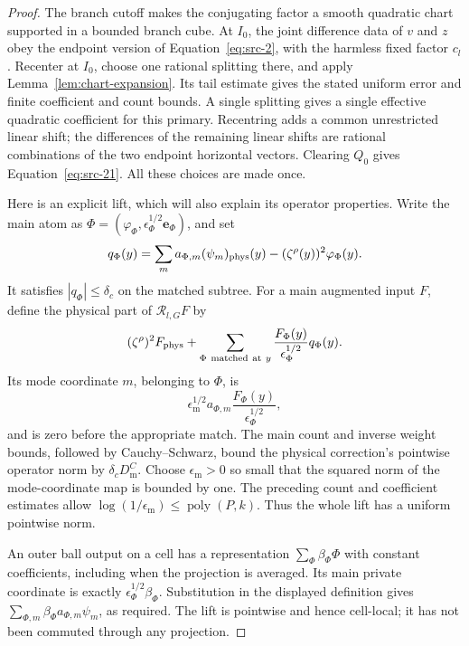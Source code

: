 \begin{proof}
The branch cutoff makes the conjugating factor a smooth quadratic
chart supported in a bounded branch cube.  At \(I_0\), the joint
difference data of \(v\) and \(z\) obey the endpoint version of
Equation~\eqref{eq:src-2}, with the harmless fixed factor \(c_l\).
Recenter at \(I_0\), choose one rational splitting there, and apply
Lemma~\ref{lem:chart-expansion}.  Its tail estimate gives the stated
uniform error and finite coefficient and count bounds.  A single
splitting gives a single effective quadratic coefficient for this
primary.  Recentring adds a common unrestricted linear shift; the
differences of the remaining linear shifts are rational combinations
of the two endpoint horizontal vectors.  Clearing \(Q_0\) gives
Equation~\eqref{eq:src-21}.  All these choices are made once.

Here is an explicit lift, which will also explain its operator
properties.  Write the main atom as
\(\Phi=(\varphi_\Phi,\epsilon_\Phi^{1/2}\mathbf e_\Phi)\), and set
\[
 q_\Phi(y)=
 \sum_m a_{\Phi,m}(\psi_m)_{\mathrm{phys}}(y)
       -(\zeta^\rho(y))^2\varphi_\Phi(y).
\]
It satisfies \(|q_\Phi|\le\delta_c\) on the matched subtree.
For a main augmented input \(F\), define the physical part of
\(\mathscr R_{l,G}F\) by
\[
 (\zeta^\rho)^2 F_{\mathrm{phys}}
 +\sum_{\Phi\ {\rm matched\ at}\ y}
       \frac{F_\Phi(y)}{\epsilon_\Phi^{1/2}}q_\Phi(y).
\]
Its mode coordinate \(m\), belonging to \(\Phi\), is
\[
 \epsilon_{\mathrm m}^{1/2}a_{\Phi,m}
       \frac{F_\Phi(y)}{\epsilon_\Phi^{1/2}},
\]
and is zero before the appropriate match.  The main count and inverse
weight bounds, followed by Cauchy--Schwarz, bound the physical
correction's pointwise operator norm by
\(\delta_c D_{\mathrm m}^{C}\).  Choose
\(\epsilon_{\mathrm m}>0\) so small that the squared norm of the
mode-coordinate map is bounded by one.  The preceding count and
coefficient estimates allow
\(\log(1/\epsilon_{\mathrm m})\le\operatorname{poly}(P,k)\).
Thus the whole lift has a uniform pointwise norm.

An outer ball output on a cell has a representation
\(\sum_\Phi\beta_\Phi\Phi\) with constant coefficients, including when
the projection is averaged.  Its main private coordinate is exactly
\(\epsilon_\Phi^{1/2}\beta_\Phi\).  Substitution in the displayed
definition gives
\(\sum_{\Phi,m}\beta_\Phi a_{\Phi,m}\psi_m\), as required.
The lift is pointwise and hence cell-local; it has not been commuted
through any projection.
\end{proof}

